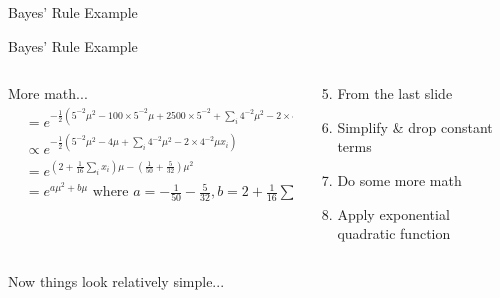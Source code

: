 \documentclass[aspectratio=169]{beamer}
\begin{document}
\begin{frame}{Bayes' Rule Example}
%
\end{frame}

\begin{frame}{Bayes' Rule Example}

\begin{columns}[T]
\begin{column}{0.7\textwidth}
	More math...
	\begin{align}
		&= e^{-\frac{1}{2} \left( 5^{-2} \mu^2 - 100 \times 5^{-2} \mu + 2500 \times 5^{-2} +
			\sum_i 4^{-2} \mu^2 - 2 \times 4^{-2} \mu x_i + 4^{-2} x_i^2 \right)}  \\
		&\propto e^{-\frac{1}{2} \left( 5^{-2} \mu^2 - 4 \mu + \sum_i 4^{-2} \mu^2 - 2 \times 4^{-2} 
			\mu x_i \right)}  \\
		&= e^{\left( 2 + \frac{1}{16} \sum_i x_i \right) \mu - \left( \frac{1}{50} + \frac{5}{32} 
			\right) \mu^2}  \\
		&= e^{a \mu^2 + b \mu} \textrm{ where } a = -\frac{1}{50} -\frac{5}{32}, 
			b = 2 + \frac{1}{16} \sum_i x_i 
	\end{align}
\end{column}
\begin{column}{0.3\textwidth}
\begin{enumerate}
\setcounter{enumi}{4}
\vspace{1.6em}
\item From the last slide
\vspace{.5em}
\item Simplify \& drop constant terms
\item Do some more math
\item Apply exponential quadratic function
\end{enumerate}
\end{column}
\end{columns}

	Now things look relatively simple...
\end{frame}
\end{document}
